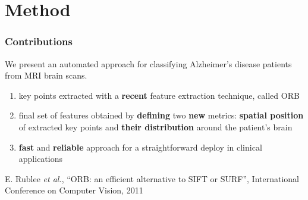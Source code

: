 \section{Method}

\begin{frame}
	\frametitle{Contributions}
	
	\Large
	
	\vspace{0.8cm}
	
	We present an automated approach for classifying Alzheimer's disease patients from MRI brain scans.
	
	\begin{enumerate}
		\item key points extracted with a \textbf{recent} feature extraction technique, called ORB
			  \cite{Rublee11}
		\item final set of features obtained by \textbf{defining} two \textbf{new} metrics:
			  \textbf{spatial position} of extracted key points and \textbf{their distribution} around
			  the patient's brain
		\item \textbf{fast} and \textbf{reliable} approach for a straightforward deploy in clinical
			  applications
	\end{enumerate}
	
	\vspace{0.6cm}
	
	\tiny
	
	\cite{Rublee11} E. Rublee \emph{et al.}, ``ORB: an efficient alternative to SIFT or SURF'',
	International Conference on Computer Vision, 2011
\end{frame}

